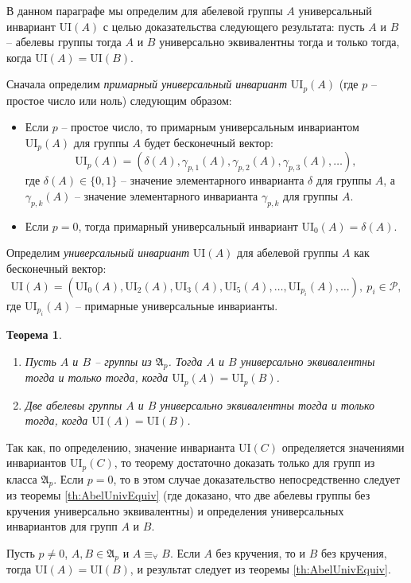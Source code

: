 \documentclass[a4paper,11pt,twoside]{article}
\newtheorem{theorem}{Теорема}[section]
\def\proof{{\noindent{\bf Доказательство.}} }
\def\A{{\mathfrak{A}}}
\def\P{{\mathcal{P}}}
\def\ui{{\mathrm{UI}}}
\begin{document}
В данном параграфе мы определим для абелевой группы $A$ универсальный инвариант $\ui(A)$ с целью доказательства следующего результата: пусть $A$ и $B$ -- абелевы группы тогда $A$ и $B$ универсально эквивалентны тогда и только тогда, когда $\ui(A) = \ui(B)$.

Сначала определим \textit{примарный универсальный инвариант} $\ui_p(A)$ (где $p$ -- простое число или ноль) следующим образом: 
\begin{itemize}
\item Если $p$ -- простое число, то примарным универсальным инвариантом $\ui_p(A)$ для группы $A$ будет бесконечный вектор:
$$\ui_p(A) = (\delta(A), \gamma_{p,1}(A), \gamma_{p,2}(A), \gamma_{p,3}(A), \ldots),$$
где $\delta(A) \in \{0,1\}$ -- значение элементарного инварианта $\delta$ для группы $A$, а $\gamma_{p,k}(A)$ -- значение элементарного инварианта $\gamma_{p,k}$ для группы $A$.
\item Если $p = 0$, тогда примарный универсальный инвариант $\ui_0(A) = \delta(A)$.
\end{itemize}

Определим \textit{универсальный инвариант} $\ui(A)$ для абелевой группы $A$ как бесконечный вектор:
$$\ui(A) = (\ui_{0}(A), \ui_{2}(A), \ui_{3}(A),\ui_{5}(A),\ldots, \ui_{p_i}(A), \ldots), \ p_i \in \P,$$
где $\ui_{p_i}(A)$ -- примарные универсальные инварианты.


\begin{theorem}\label{th:UnivEquivOfGroups}
\begin{enumerate}
\item Пусть $A$ и $B$ -- группы из $\A_p$. Тогда $A$ и $B$ универсально эквивалентны тогда и только тогда, когда $\ui_p(A) = \ui_p(B)$.
\item Две абелевы группы $A$ и $B$ универсально эквивалентны тогда и только тогда, когда $\ui(A) = \ui(B)$.
\end{enumerate}
\end{theorem}


\proof Так как, по определению, значение инварианта $\ui(C)$ определяется значениями инвариантов $\ui_p(C)$, то теорему достаточно доказать только для групп из класса $\A_p$. Если $p=0$, то в этом случае доказательство непосредственно следует из теоремы \ref{th:AbelUnivEquiv} (где доказано, что две абелевы группы без кручения универсально эквивалентны) и определения универсальных инвариантов для групп $A$ и $B$.

Пусть $p \neq 0$, $A, B \in \A_p$ и $A \equiv_\forall B$. Если $A$ без кручения, то и $B$ без кручения, тогда $\ui(A) = \ui(B)$, и результат следует из теоремы \ref{th:AbelUnivEquiv}.
\end{document}
